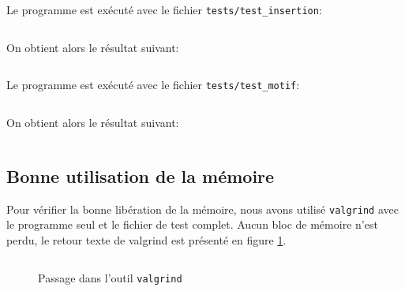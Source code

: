 	\newpage
	Le programme est exécuté avec le fichier \texttt{tests/test\_insertion}:
	\inputminted[frame=single,label=Test]{text}{../tests/test_insertion}
	On obtient alors le résultat suivant: 
	\begin{multicols}{2}
	\inputminted[breaklines=true,frame=single,label=Resultat]{text}{../tests/resultat_test_insertion}
	\end{multicols}

	\newpage
	Le programme est exécuté avec le fichier \texttt{tests/test\_motif}:
	\inputminted[frame=single,label=Test]{text}{../tests/test_motif}
	On obtient alors le résultat suivant: 
	\begin{multicols}{2}
	\inputminted[breaklines=true,frame=single,label=Resultat]{text}{../tests/resultat_test_motif}
	\end{multicols}

\subsection{Bonne utilisation de la mémoire}
	Pour vérifier la bonne libération de la mémoire, nous avons utilisé \texttt{valgrind} avec le programme seul et le fichier de test complet. Aucun bloc de mémoire n'est perdu, le retour texte de valgrind est présenté en figure \ref{fig:valgrind}.
	\begin{figure}[H]
	  \inputminted[frame=single,label=Resultat Valgrind]{text}{../tests/valgrind_test}
	  \caption{Passage dans l'outil \texttt{valgrind}}
	  \label{fig:valgrind}
	\end{figure}
